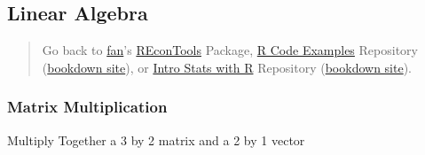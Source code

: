 \documentclass[
]{book}
\begin{document}
\begin{table}[!h]
\centering
{}
\end{table}

\hypertarget{linear-algebra}{%
\subsection{Linear Algebra}\label{linear-algebra}}

\begin{quote}
Go back to \href{http://fanwangecon.github.io/}{fan}'s \href{https://fanwangecon.github.io/REconTools/}{REconTools} Package, \href{https://fanwangecon.github.io/R4Econ/}{R Code Examples} Repository (\href{https://fanwangecon.github.io/R4Econ/bookdown}{bookdown site}), or \href{https://fanwangecon.github.io/Stat4Econ/}{Intro Stats with R} Repository (\href{https://fanwangecon.github.io/Stat4Econ/bookdown}{bookdown site}).
\end{quote}

\hypertarget{matrix-multiplication}{%
\subsubsection{Matrix Multiplication}\label{matrix-multiplication}}

Multiply Together a 3 by 2 matrix and a 2 by 1 vector
\end{document}
